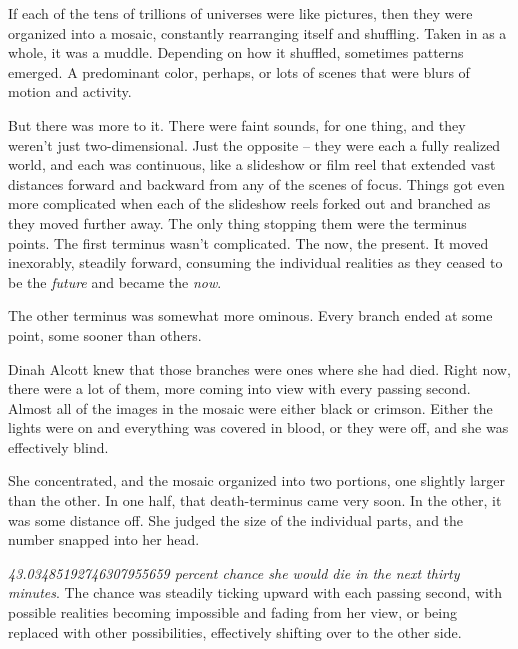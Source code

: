 





If each of the tens of trillions of universes were like pictures, then they were organized into a mosaic, constantly rearranging itself and shuffling.  Taken in as a whole, it was a muddle.  Depending on how it shuffled, sometimes patterns emerged.  A predominant color, perhaps, or lots of scenes that were blurs of motion and activity.



But there was more to it.  There were faint sounds, for one thing, and they weren't just two-dimensional.  Just the opposite – they were each a fully realized world, and each was continuous, like a slideshow or film reel that extended vast distances forward and backward from any of the scenes of focus.  Things got even more complicated when each of the slideshow reels forked out and branched as they moved further away.  The only thing stopping them were the terminus points.  The first terminus wasn't complicated.  The now, the present.  It moved inexorably, steadily forward, consuming the individual realities as they ceased to be the \emph{future} and became the \emph{now}.



The other terminus was somewhat more ominous.  Every branch ended at some point, some sooner than others.



Dinah Alcott knew that those branches were ones where she had died.  Right now, there were a lot of them, more coming into view with every passing second.  Almost all of the images in the mosaic were either black or crimson.  Either the lights were on and everything was covered in blood, or they were off, and she was effectively blind.



She concentrated, and the mosaic organized into two portions, one slightly larger than the other.  In one half, that death-terminus came very soon.  In the other, it was some distance off.  She judged the size of the individual parts, and the number snapped into her head.



\emph{43.03485192746307955659 percent chance she would die in the next thirty minutes}.  The chance was steadily ticking upward with each passing second, with possible realities becoming impossible and fading from her view, or being replaced with other possibilities, effectively shifting over to the other side.



